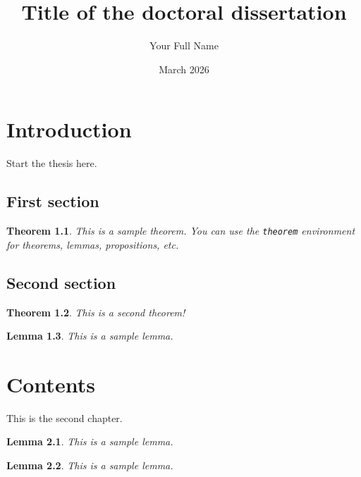 \documentclass[phd,english]{../uw-thesis2}
\title{Title of the doctoral dissertation}
\author{Your Full Name}
\date{March 2026}
\newtheorem{theorem}{Theorem}[chapter]
\newtheorem{lemma}[theorem]{Lemma}
\begin{document}
\makefrontmatter

\chapter{Introduction}
Start the thesis here.

\section{First section}

\begin{theorem}
This is a sample theorem. You can use the \texttt{theorem} environment for theorems, lemmas, propositions, etc.
\end{theorem}

\cite{tarski_decision}

\section{Second section}

\begin{theorem}
This is a second theorem!
\end{theorem}

\begin{lemma}
This is a sample lemma.
\end{lemma}

\chapter{Contents}

This is the second chapter.

\begin{lemma}
This is a sample lemma.
\end{lemma}

\begin{lemma}
This is a sample lemma.
\end{lemma}



\end{document}
